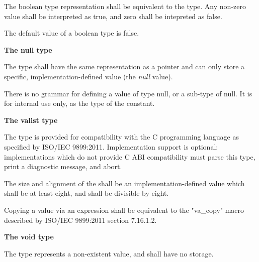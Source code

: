 \specsubsubitem
The boolean type representation shall be equivalent to the  type.
Any non-zero value shall be interpreted as true, and zero shall be intepreted as
false.

\specsubsubitem
The default value of a boolean type is false.

\textbf{The null type}

\specsubsubitem
The  type shall have the same representation as a pointer and can
only store a specific, implementation-defined value (the \textit{null} value).

\specsubsubitem
There is no grammar for defining a value of type null, or a sub-type of null. It
is for internal use only, as the type of the  constant.

\textbf{The valist type}

\specsubsubitem
The  type is provided for compatibility with the C programming
language as specified by ISO/IEC 9899:2011. Implementation support is optional:
implementations which do not provide C ABI compatibility must parse this type,
print a diagnostic message, and abort.

\specsubsubitem
The size and alignment of the  shall be an
implementation-defined value which shall be at least eight, and shall be
divisible by eight.

\specsubsubitem
Copying a  value via an  expression
shall be equivalent to the "va\_copy" macro described by ISO/IEC 9899:2011
section 7.16.1.2.

\textbf{The void type}

\specsubsubitem
The  type represents a non-existent value, and shall have no
storage.


